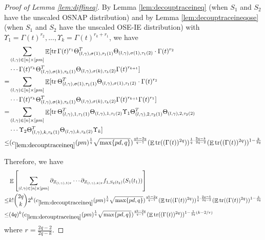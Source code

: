 \documentclass[11pt]{amsart}
\numberwithin{equation}{section}
\numberwithin{equation}{section}
\DeclareMathOperator{\E}{\mathbb{E}}
\DeclareMathOperator*{\tr}{tr}
\theoremstyle{remark}
\theoremstyle{definition}
\begin{document}
\begin{proof}[Proof of Lemma \ref{lem:diffineq}]
By Lemma \ref{lem:decouptraceineq} (when $S_1$ and $S_2$ have the unscaled OSNAP distribution) and by Lemma \ref{lem:decouptraceineqose} (when $S_1$ and $S_2$ have the unscaled OSE-IE distribution) with $\Upsilon_1=\Gamma(t)^{r_2},...,\Upsilon_k=\Gamma(t)^{r_k+r_1}$, we have
\begin{equation}\label{tracebound}
\begin{aligned}
&\sum_{(l,\gamma) \in [n] \times [pm]} \E [ \tr \Gamma(t)^{r_1} \Theta_{(l,\gamma), \sigma(1), \tau_1(1)}^T\Theta_{(l,\gamma), \sigma(1), \tau_1(2)}\cdot
	\Gamma(t)^{r_2} \\&\cdots \Gamma(t)^{r_k}\Theta_{(l,\gamma), \sigma(k), \tau_k(1)}^T\Theta_{(l,\gamma), \sigma(k), \tau_k(2)}\Gamma(t)^{r_{k+1}} ]\\=
 &\sum_{(l,\gamma) \in [n] \times [pm]} \E [ \tr  \Theta_{(l,\gamma), \sigma(1), \tau_1(1)}^T\Theta_{(l,\gamma), \sigma(1), \tau_1(2)} \cdot
	\Gamma(t)^{r_2} \\&\cdots \Gamma(t)^{r_k}\Theta_{(l,\gamma), \sigma(k), \tau_k(1)}^T\Theta_{(l,\gamma), \sigma(k), \tau_k(2)}\Gamma(t)^{r_{k+1}}\Gamma(t)^{r_1} ]\\=
    &\sum_{(l,\gamma) \in [n] \times [pm]} \E[ \tr \Theta_{(l,\gamma), 1, \tau_1(1)}^T\Theta_{(l,\gamma), 1, \tau_1(2)}
	\Upsilon_1\Theta_{(l,\gamma), 2, \tau_2(1)}^T\Theta_{(l,\gamma), 2, \tau_2(2)} \\&\cdots
	\Upsilon_2\Theta_{(l,\gamma), k, \tau_k(1)}^T\Theta_{(l,\gamma), k, \tau_k(2)}\Upsilon_k]  \\ \le &
       (c_{\ref*{lem:decouptraceineq}}(pm)^{\frac{1}{q}}\sqrt{\max\{pd,q\}})^{\frac{qk-2q}{q-1}} (\E \tr((\Gamma(t))^{2q}))^{\frac{1}{q} \cdot \frac{2q-k}{2q-2}} (\E \tr((\Gamma(t))^{2q}))^{1-\frac{k}{2q}}
\end{aligned}
\end{equation}


Therefore, we have
\begin{align*}
    &\E \left[ \sum_{(l,\gamma) \in [n] \times [pm]} \partial_{Z_{(l,\gamma),1|\pi}}\cdots\partial_{Z_{(l,\gamma),k|\pi}}  f_{1,S_2(t_2)}(S_1(t_1))  \right]
    \\\le& k! \binom{2q}{k} 2^k   (c_{\ref*{lem:decouptraceineq}}(pm)^{\frac{1}{q}}\sqrt{\max\{pd,q\}})^{\frac{qk-2q}{q-1}} (\E \tr((\Gamma(t))^{2q}))^{\frac{1}{q} \cdot \frac{2q-k}{2q-2}} (\E \tr((\Gamma(t))^{2q}))^{1-\frac{k}{2q}} 
    \\\le& (4q)^k   (c_{\ref*{lem:decouptraceineq}}(pm)^{\frac{1}{q}}\sqrt{\max\{pd,q\}})^{\frac{qk-2q}{q-1}}  (\E \tr((\Gamma(t))^{2q}))^{1-\frac{1}{2q}(k-2/r)}
\end{align*}
where $r=\frac{2q-2}{2q-k}$.


\end{proof}
\end{document}
